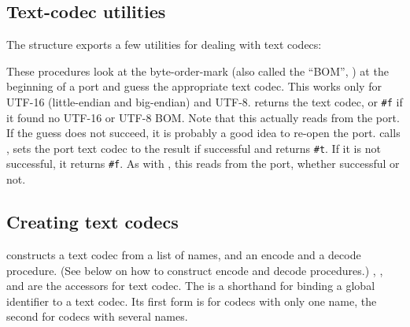 \subsection{Text-codec utilities}

The  structure exports a few utilities for
dealing with text codecs:

\begin{protos}
\end{protos}
%
These procedures look at the byte-order-mark (also called the
``BOM'', ) at the
beginning of a port and guess the appropriate text codec.  This works
only for UTF-16 (little-endian and big-endian) and UTF-8.
 returns the text codec,
or \texttt{\#f} if it found no UTF-16 or UTF-8 BOM.  Note that this
actually reads from the port.  If the guess does not succeed, it is
probably a good idea to re-open the port.
 calls
, sets the port text
codec to the result if successful and returns \texttt{\#t}.  If it is
not successful, it returns \texttt{\#f}.  As with
, this reads from the
port, whether successful or not.

\subsection{Creating text codecs}

\begin{protos}
\end{protos}
%
 constructs a text codec from a list of names,
and an encode and a decode procedure.  (See below on how to construct
encode and decode procedures.)  ,
, and
 are the accessors for text codec.
The  is a shorthand for binding a global
identifier to a text codec.  Its first form is for codecs with only
one name, the second for codecs with several names.

